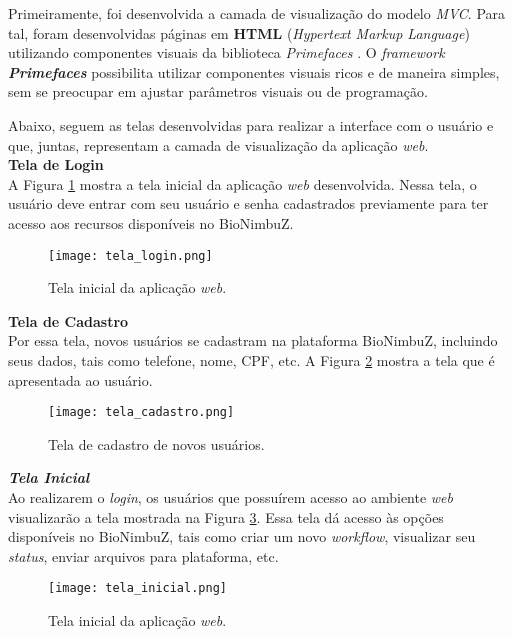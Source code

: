 Primeiramente, foi desenvolvida a camada de visualização do modelo \textit{MVC}. Para tal, foram desenvolvidas páginas em \textbf{HTML} \cite{html_rfc} (\textit{Hypertext Markup Language}) utilizando componentes visuais da biblioteca \textit{Primefaces} \cite{primefaces_url}. O \textit{framework} \textbf{\textit{Primefaces}} possibilita utilizar componentes visuais ricos e de maneira simples, sem se preocupar em ajustar parâmetros visuais ou de programação.

Abaixo, seguem as telas desenvolvidas para realizar a interface com o usuário e que, juntas, representam a camada de visualização da aplicação \textit{web}. \\


\noindent
\textbf{Tela de Login} \\

\noindent
A Figura \ref{fig:tela_login} mostra a tela inicial da aplicação \textit{web} desenvolvida. Nessa tela, o usuário deve entrar com seu usuário e senha cadastrados previamente para ter acesso aos recursos disponíveis no BioNimbuZ.

\begin{figure}[H]
	\centering
	\texttt{[image: tela\_login.png]}
	\caption{Tela inicial da aplicação \textit{web}.}
	\label{fig:tela_login}
\end{figure}

\noindent
\textbf{Tela de Cadastro} \\

\noindent
Por essa tela, novos usuários se cadastram na plataforma BioNimbuZ, incluindo seus dados, tais como telefone, nome, CPF, etc. A Figura \ref{fig:tela_cadastro} mostra a tela que é apresentada ao usuário.

\begin{figure}[H]
	\centering
	\texttt{[image: tela\_cadastro.png]}
	\caption{Tela de cadastro de novos usuários.}
	\label{fig:tela_cadastro}
\end{figure}

\noindent
\textbf{\textit{Tela Inicial}} \\

\noindent
Ao realizarem o \textit{login}, os usuários que possuírem acesso ao ambiente \textit{web} visualizarão a tela mostrada na Figura \ref{fig:tela_inicial}. Essa tela dá acesso às opções disponíveis no BioNimbuZ, tais como criar um novo \textit{workflow}, visualizar seu \textit{status}, enviar arquivos para plataforma, etc.

\begin{figure}[H]
	\centering
	\texttt{[image: tela\_inicial.png]}
	\caption{Tela inicial da aplicação \textit{web}.}
	\label{fig:tela_inicial}
\end{figure}

